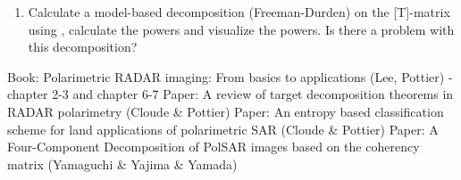 \begin{enumerate}
\item Calculate a model-based decomposition (Freeman-Durden) on the [T]-matrix using \cite{YamaguchiP}, calculate the powers and visualize the powers. Is there a problem with this decomposition?
\end{enumerate}
\begin{thebibliography}{123}
 Book: Polarimetric RADAR imaging: From basics to applications (Lee, Pottier) - chapter 2-3 and chapter 6-7 
 Paper: A review of target decomposition theorems in RADAR polarimetry (Cloude \& Pottier) 
 Paper: An entropy based classification scheme for land applications of polarimetric SAR (Cloude \& Pottier) 
 Paper: A Four-Component Decomposition of PolSAR images based on the coherency matrix (Yamaguchi \& Yajima \& Yamada) 
\end{thebibliography}
